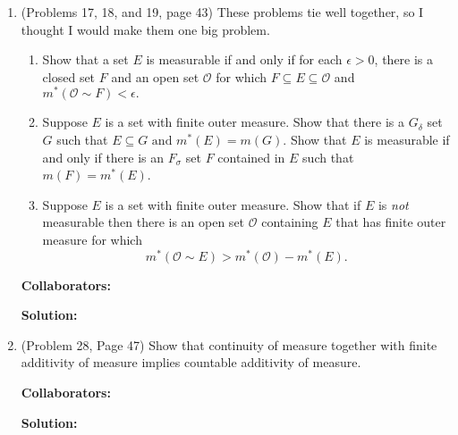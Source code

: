 \documentclass{article}%
\newenvironment{proof}[1][Proof]{\textbf{#1.} }{\ \rule{0.5em}{0.5em}}
\begin{document}
\begin{enumerate}
\bigskip
\textbf{Collaborators:}\\
\smallskip
 
\textbf{Solution:}
\begin{proof}
\textbf{(a)} \\[2pt]

\end{proof}
\bigskip



\item (Problems 17, 18, and 19, page 43) These problems tie well together, so I thought I would make them one big problem.

\begin{enumerate}
\item Show that a set $E$ is measurable if and only if for each $\epsilon > 0$, there is a closed set $F$ and an open set $\mathcal{O}$ for which $F\subseteq E \subseteq \mathcal{O}$ and $m^*(\mathcal{O} \sim F)< \epsilon.$
\item Suppose $E$ is a set with finite outer measure. Show that there is a $G_{\delta}$ set $G$ such that $
 E \subseteq G \text{ and } m^*(E) = m(G).$  Show that $E$ is measurable if and only if there is an $F_{\sigma}$ set $F$ contained in $E$ such that $m(F) = m^*(E)$.
\item Suppose $E$ is a set with finite outer measure. Show that if $E$ is \emph{not} measurable then there is an open set $\mathcal{O}$ containing $E$ that has finite outer measure for which \[
m^*(\mathcal{O}\sim E) > m^*(\mathcal{O}) - m^*(E).                                                                                                                                                                                                
                                                                                                                                                                                               \]

  
\end{enumerate}


\bigskip
\textbf{Collaborators:}\\
\smallskip
 
\textbf{Solution:}
\bigskip


\item (Problem 28, Page 47) Show that continuity of measure together  with finite additivity of measure implies countable additivity of measure.

\bigskip
\textbf{Collaborators:}\\
\smallskip
 
\textbf{Solution:}
\bigskip


\end{enumerate}
\end{document}
